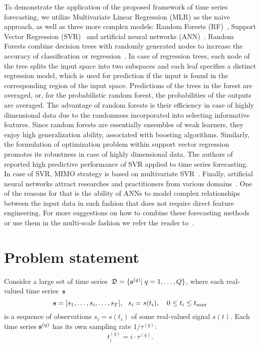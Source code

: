 \documentclass[conference]{IEEEtran}
\begin{document}
To demonstrate the application of the proposed framework of time series forecasting, we utilize Multivariate Linear Regression (MLR) as the naive approach, as well as three more complex models: Random Forests (RF)~\cite{Yu2016, Kane2014}, Support Vector Regression (SVR)~\cite{Trafalis2000, Navarrete2015, Hao2006} and artificial neural networks (ANN)~\cite{Busseti2012, Taylor2009}.  Random Forests combine decision trees with randomly generated nodes to increase the accuracy of classification or regression~\cite{Criminisi2011}. In case of regression trees, each node of the tree splits the input space into two subspaces and each leaf specifies a distinct regression model, which is used for prediction if the input is found in the corresponding region of the input space. Predictions of the trees in the forest are averaged, or, for the probabilistic random forest, the probabilities of the outputs are averaged. The advantage of random forests is their efficiency in case of highly dimensional data due to the randomness incorporated into selecting informative features. Since random forests are essentially ensembles of weak learners, they enjoy high generalization ability, associated with boosting algorithms.
 Similarly, the formulation of optimization problem within support vector regression promotes its robustness in case of highly dimensional data. The authors of~\cite{Trafalis2000, Hao2006} reported high predictive performance of SVR applied to time series forecasting. In case of SVR, MIMO strategy is based on multivariate SVR~\cite{PerezCruz2002}. Finally, artificial neural networks attract researches and practitioners from various domains~\cite{Taylor2009, Qiu2014}. One of the reasons for that is the ability of ANNs to model complex relationships between the input data in such fashion that does not require direct feature engineering. For more suggestions on how to combine these forecasting methods~\cite{Qiu2014, Grover2015} or use them in the multi-scale fashion we refer the reader to~\cite{Chen2004, Zhu2012, Cui2016, Bai2015, Ferrari2012}.


\section{Problem statement}
Consider a large set of time series~${\mathfrak{D}}=\{{\mathbf{s}}^{(q)}| \; q = 1,\dots, {Q}\}$, where each real-valued time series~${\mathbf{s}}$
\[ {\mathbf{s}} = [s_1, \dots, s_i, \dots, s_{T}], ~~ s_i = s(t_i),\quad 0 \leq t_i \leq t_{\max}\]
is a sequence of observations $s_i = s(t_i)$ of some real-valued signal $s(t)$.
Each time series ${\mathbf{s}}^{(q)}$ has its own sampling rate $1/\tau^{(q)}$:
\[t_i^{(q)} = {i}\cdot\tau^{(q)}.\]
\end{document}
